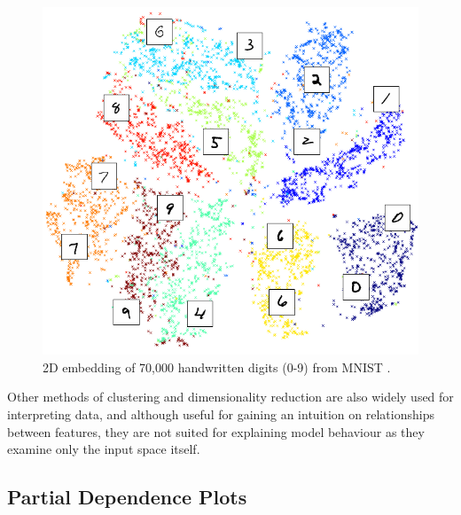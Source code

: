 \documentclass[main]{subfiles}
\begin{document}
\begin{figure}[h]
\centering
\includegraphics[scale=0.2]{tsne.png}
\caption{2D embedding of 70,000 handwritten digits (0-9) from MNIST \cite{tsne}.}
\label{tsneimg}
\end{figure}

Other methods of clustering and dimensionality reduction are also widely used for interpreting data, and although useful for gaining an intuition on relationships between features, they are not suited for explaining model behaviour as they examine only the input space itself. 

\subsection{Partial Dependence Plots}
\end{document}
